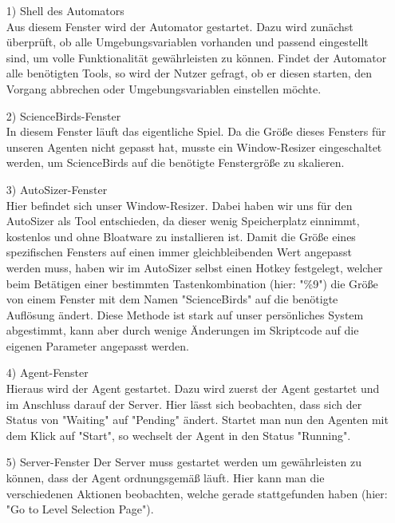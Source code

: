 \begin{itemize}
	\item[1)] Shell des Automators \\
	Aus diesem Fenster wird der Automator gestartet. Dazu wird zunächst überprüft, ob alle Umgebungsvariablen vorhanden und passend eingestellt sind, um volle Funktionalität gewährleisten zu können. Findet der Automator alle benötigten Tools, so wird der Nutzer gefragt, ob er diesen starten, den Vorgang abbrechen oder Umgebungsvariablen einstellen möchte.
	\item[2)] ScienceBirds-Fenster \\
	In diesem Fenster läuft das eigentliche Spiel. Da die Größe dieses Fensters für unseren Agenten nicht gepasst hat, musste ein Window-Resizer eingeschaltet werden, um ScienceBirds auf die benötigte Fenstergröße zu skalieren.
	\item[3)] AutoSizer-Fenster \\
	Hier befindet sich unser Window-Resizer. Dabei haben wir uns für den AutoSizer als Tool entschieden, da dieser wenig Speicherplatz einnimmt, kostenlos und ohne Bloatware zu installieren ist. Damit die Größe eines spezifischen Fensters auf einen immer gleichbleibenden Wert angepasst werden muss, haben wir im AutoSizer selbst einen Hotkey festgelegt, welcher beim Betätigen einer bestimmten Tastenkombination (hier: "\%9") die Größe von einem Fenster mit dem Namen "ScienceBirds" auf die benötigte Auflösung ändert. Diese Methode ist stark auf unser persönliches System abgestimmt, kann aber durch wenige Änderungen im Skriptcode auf die eigenen Parameter angepasst werden.
	\item[4)] Agent-Fenster \\ 
	Hieraus wird der Agent gestartet. Dazu wird zuerst der Agent gestartet und im Anschluss darauf der Server. Hier lässt sich beobachten, dass sich der Status von "Waiting" auf "Pending" ändert. Startet man nun den Agenten mit dem Klick auf "Start", so wechselt der Agent in den Status "Running".
	\item[5)] Server-Fenster
	Der Server muss gestartet werden um gewährleisten zu können, dass der Agent ordnungsgemäß läuft. Hier kann man die verschiedenen Aktionen beobachten, welche gerade stattgefunden haben (hier: "Go to Level Selection Page").
\end{itemize}

